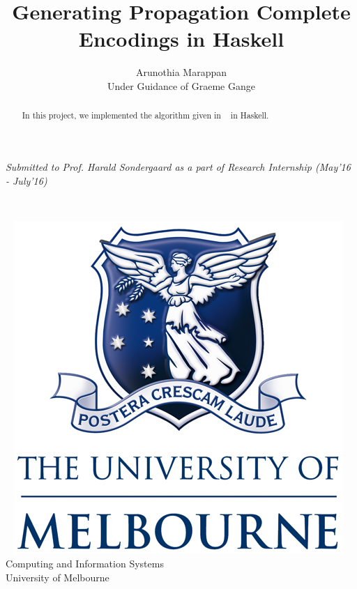 \documentclass{article}
\title{Generating Propagation Complete Encodings in Haskell \\ }
\author{\vspace{2mm} \large Arunothia Marappan \\ Under Guidance of Graeme Gange }
\date{}
\theoremstyle{plain}
\begin{document}
\maketitle
\begin{center}
\emph{Submitted to Prof. Harald Sondergaard as a part of Research Internship (May'16 - July'16)}
\end{center}
\vspace*{2cm}~
\begin{abstract}
 In this project, we implemented the algorithm given in ~\cite{PCE} in Haskell.   
\end{abstract}

\begin{center}
\vspace*{7cm}~ \includegraphics[scale=1]{UOM.png} \\
\large{Computing and Information Systems \\ University of Melbourne}
\end{center}
\newpage
\nocite{*}


\end{document}
